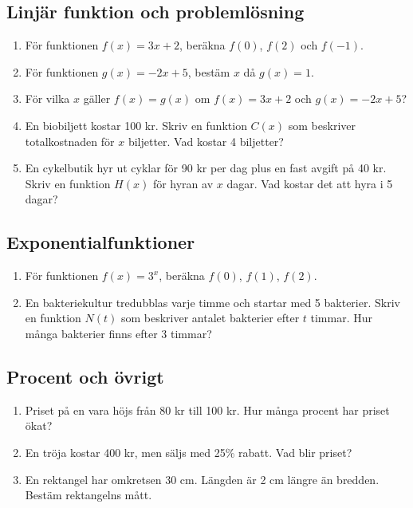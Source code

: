 \documentclass[a4paper,11pt]{article}
\begin{document}
\subsection*{Linjär funktion och problemlösning}
\begin{enumerate}[label=\textbf{3.\arabic*.}]
    \item För funktionen $f(x) = 3x + 2$, beräkna $f(0)$, $f(2)$ och $f(-1)$.
    \item För funktionen $g(x) = -2x + 5$, bestäm $x$ då $g(x) = 1$.
    \item För vilka $x$ gäller $f(x) = g(x)$ om $f(x) = 3x + 2$ och $g(x) = -2x + 5$?
    \item En biobiljett kostar 100 kr. Skriv en funktion $C(x)$ som beskriver totalkostnaden för $x$ biljetter. Vad kostar 4 biljetter?
    \item En cykelbutik hyr ut cyklar för 90 kr per dag plus en fast avgift på 40 kr. Skriv en funktion $H(x)$ för hyran av $x$ dagar. Vad kostar det att hyra i 5 dagar?
\end{enumerate}

\subsection*{Exponentialfunktioner}
\begin{enumerate}[label=\textbf{4.\arabic*.}]
    \item För funktionen $f(x) = 3^x$, beräkna $f(0)$, $f(1)$, $f(2)$.
    \item En bakteriekultur tredubblas varje timme och startar med 5 bakterier. Skriv en funktion $N(t)$ som beskriver antalet bakterier efter $t$ timmar. Hur många bakterier finns efter 3 timmar?
\end{enumerate}

\subsection*{Procent och övrigt}
\begin{enumerate}[label=\textbf{5.\arabic*.}]
    \item Priset på en vara höjs från 80 kr till 100 kr. Hur många procent har priset ökat?
    \item En tröja kostar 400 kr, men säljs med 25\% rabatt. Vad blir priset?
    \item En rektangel har omkretsen 30 cm. Längden är 2 cm längre än bredden. Bestäm rektangelns mått.
\end{enumerate}
\end{document}
